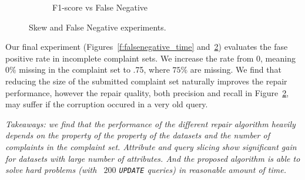 \begin{figure}[h]
\begin{subfigure}[t]{.3\textwidth}
    \vspace*{-.2in}
    \caption{F1-score vs False Negative}
    \label{f:falsenegative_acc} 
    \end{subfigure}
    \vspace*{-.1in}
    \caption{Skew and False Negative experiments. }
  \end{figure}





Our final experiment (Figures~\ref{f:falsenegative_time} and~\ref{f:falsenegative_acc}) evaluates the fase positive rate in incomplete complaint sets.
We increase the rate from $0$, meaning $0\%$ missing in the complaint set to .75, where $75\%$ are missing.  
We find that reducing the size of the submitted complaint set naturally improves the repair performance,
however the repair quality, both precision and recall in Figure~\ref{f:falsenegative_acc}, may suffer if the corruption occured in a very old query.


% 

\smallskip

\textit{Takeaways: we find that the performance of the different repair algorithm 
heavily depends on the property of the property of the datasets and the 
number of complaints in the complaint set. Attribute and query slicing show significant gain for 
datasets with large number of attributes. And the proposed \sys algorithm is able to solve hard problems
(with ~$200$ \texttt{UPDATE} queries) in reasonable amount of time. }














